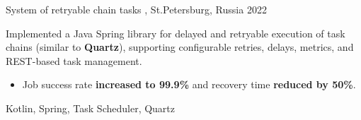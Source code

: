 \begin{projects}
	\project
        {System of retryable chain tasks}
        {, St.Petersburg, Russia}
        {2022}
        {
            Implemented a Java Spring library for delayed and retryable execution of task chains (similar to \textbf{Quartz}), supporting configurable retries, delays, metrics, and REST-based task management.
        
            \begin{itemize}
                \item {
                    Job success rate \textbf{increased to 99.9\%} and recovery time \textbf{reduced by 50\%}.
                }
            \end{itemize}
        }
	    { Kotlin, Spring, Task Scheduler, Quartz }
\end{projects}